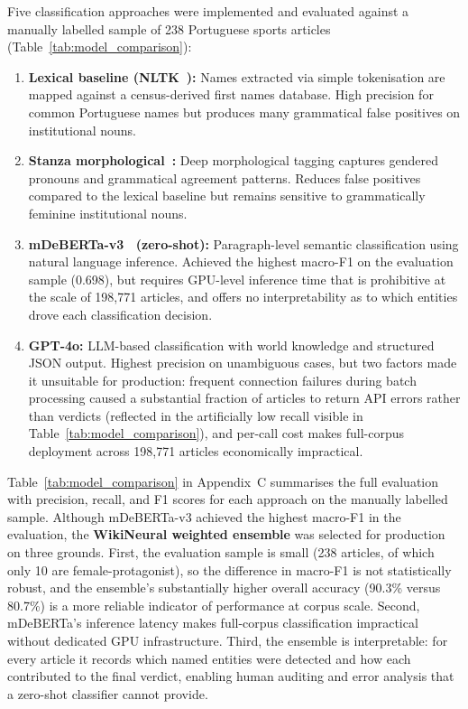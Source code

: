 \documentclass[11pt,a4paper]{article}
\begin{document}
Five classification approaches were implemented and evaluated against a manually labelled sample of 238 Portuguese sports articles (Table~\ref{tab:model_comparison}):

\begin{enumerate}[itemsep=3pt]
  \item \textbf{Lexical baseline (NLTK~\cite{NLTK}):} Names extracted via simple tokenisation are mapped against a census-derived first names database. High precision for common Portuguese names but produces many grammatical false positives on institutional nouns.
  \item \textbf{Stanza morphological~\cite{Stanza}:} Deep morphological tagging captures gendered pronouns and grammatical agreement patterns. Reduces false positives compared to the lexical baseline but remains sensitive to grammatically feminine institutional nouns.
  \item \textbf{mDeBERTa-v3~\cite{mDeBERTa} (zero-shot):} Paragraph-level semantic classification using natural language inference. Achieved the highest macro-F1 on the evaluation sample (0.698), but requires GPU-level inference time that is prohibitive at the scale of 198{,}771 articles, and offers no interpretability as to which entities drove each classification decision.
  \item \textbf{GPT-4o:} LLM-based classification with world knowledge and structured JSON output. Highest precision on unambiguous cases, but two factors made it unsuitable for production: frequent connection failures during batch processing caused a substantial fraction of articles to return API errors rather than verdicts (reflected in the artificially low recall visible in Table~\ref{tab:model_comparison}), and per-call cost makes full-corpus deployment across 198{,}771 articles economically impractical.
\end{enumerate}

Table~\ref{tab:model_comparison} in Appendix~C summarises the full evaluation with precision, recall, and F1 scores for each approach on the manually labelled sample. Although mDeBERTa-v3 achieved the highest macro-F1 in the evaluation, the \textbf{WikiNeural weighted ensemble} was selected for production on three grounds. First, the evaluation sample is small (238 articles, of which only 10 are female-protagonist), so the difference in macro-F1 is not statistically robust, and the ensemble's substantially higher overall accuracy (90.3\% versus 80.7\%) is a more reliable indicator of performance at corpus scale. Second, mDeBERTa's inference latency makes full-corpus classification impractical without dedicated GPU infrastructure. Third, the ensemble is interpretable: for every article it records which named entities were detected and how each contributed to the final verdict, enabling human auditing and error analysis that a zero-shot classifier cannot provide.
\end{document}
